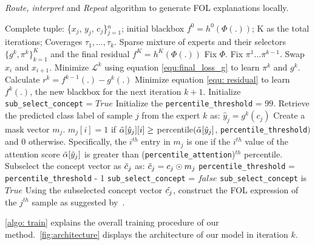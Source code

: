 \begin{algorithm}[h]
   \caption{\emph{Route, interpret} and \emph{Repeat} algorithm to generate FOL explanations locally.}
   \label{algo: train}
\begin{algorithmic}[1]
    Complete tuple: \{$x_j$, $y_j$, $c_j$\}$_{j=1}^n$; initial blackbox $f^0 = h^0(\Phi(.))$; K as the total iterations; Coverages $\tau_1, \dots ,\tau_k$.
    Sparse mixture of experts and their selectors $\{g^k, \pi^k\}_{k=1}^K$ and the final residual $f^K = h^K(\Phi(.))$
   \STATE Fix $\Phi$.
       \STATE  Fix $\pi^1 \dots \pi^{k-1}$.
       \STATE Swap $x_i$ and $x_{i+1}$.
       \STATE Minimize $\mathcal{L}^k$ using equation \ref{equ:final_loss_g} to learn $\pi^k$ and $g^k$.
       \STATE Calculate $r^k = f^{k-1}(.) - g^k(.)$
       \STATE Minimize equation \ref{equ: residual} to learn $f^k(.)$, the new blackbox for the next iteration $k+1$.
       \ENDFOR
                \REPEAT
                    \STATE Initialize \texttt{sub\_select\_concept} = $True$
                    \STATE Initialize the \texttt{percentile\_threshold} = $99$.
                    \STATE Retrieve the predicted class label of sample $j$ from the expert $k$ as: $\hat{y}_j = g^k(c_j)$
                    \STATE Create a mask vector $m_j$. $m_j[i] = 1$ if 
                    $\Tilde{\alpha}[\hat{y}_j][i] \geq$ percentile$(\Tilde{\alpha}[\hat{y}_j]$, \texttt{percentile\_threshold}$)$ and $0$ otherwise. Specifically, the $i^{th}$ entry in $m_j$ is one if the $i^{th}$ value of the attention score $\Tilde{\alpha}[\hat{y}_j]$ is greater than (\texttt{percentile\_attention})$^{th}$ percentile. 
                    \STATE Subselect the concept vector as $\Tilde{c}_j$ as: $\Tilde{c}_j = c_j\odot m_j$
                        \STATE \texttt{percentile\_threshold} = \texttt{percentile\_threshold} - 1
                        \STATE \texttt{sub\_select\_concept} = $false$
                    \ENDIF
                \UNTIL \texttt{sub\_select\_concept} is $True$
                \STATE Using the subselected concept vector $\Tilde{c_j}$, construct the FOL expression of the $j^{th}$ sample as suggested by~\cite{barbiero2022entropy}.
            \ENDFOR
    \ENDFOR
\end{algorithmic}
\end{algorithm}

\cref{algo: train} explains the overall training procedure of our method.~\cref{fig:architecture} displays the architecture of our model in iteration $k$.


